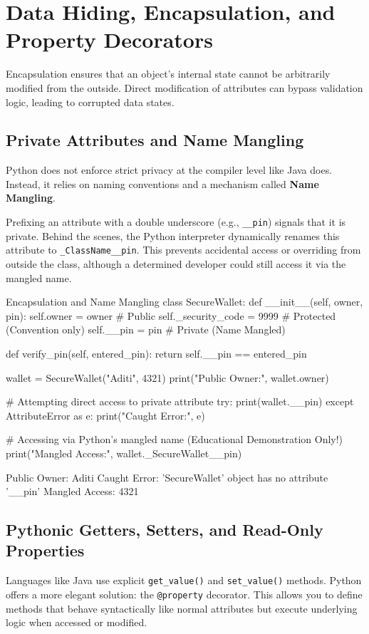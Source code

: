 \section{Data Hiding, Encapsulation, and Property Decorators}

Encapsulation ensures that an object's internal state cannot be arbitrarily modified from the outside. Direct modification of attributes can bypass validation logic, leading to corrupted data states.

\subsection{Private Attributes and Name Mangling}
Python does not enforce strict privacy at the compiler level like Java does. Instead, it relies on naming conventions and a mechanism called \textbf{Name Mangling}.

Prefixing an attribute with a double underscore (e.g., \texttt{\_\_pin}) signals that it is private. Behind the scenes, the Python interpreter dynamically renames this attribute to \texttt{\_ClassName\_\_pin}. This prevents accidental access or overriding from outside the class, although a determined developer could still access it via the mangled name.

\begin{pythoncode}{Encapsulation and Name Mangling}
class SecureWallet:
    def __init__(self, owner, pin):
        self.owner = owner          # Public
        self._security_code = 9999  # Protected (Convention only)
        self.__pin = pin            # Private (Name Mangled)
        
    def verify_pin(self, entered_pin):
        return self.__pin == entered_pin

wallet = SecureWallet("Aditi", 4321)
print("Public Owner:", wallet.owner)

# Attempting direct access to private attribute
try:
    print(wallet.__pin)
except AttributeError as e:
    print("Caught Error:", e)

# Accessing via Python's mangled name (Educational Demonstration Only!)
print("Mangled Access:", wallet._SecureWallet__pin)
\end{pythoncode}

\begin{outputbox}
Public Owner: Aditi
Caught Error: 'SecureWallet' object has no attribute '__pin'
Mangled Access: 4321
\end{outputbox}

\subsection{Pythonic Getters, Setters, and Read-Only Properties}
Languages like Java use explicit \texttt{get\_value()} and \texttt{set\_value()} methods. Python offers a more elegant solution: the \texttt{@property} decorator. This allows you to define methods that behave syntactically like normal attributes but execute underlying logic when accessed or modified.

